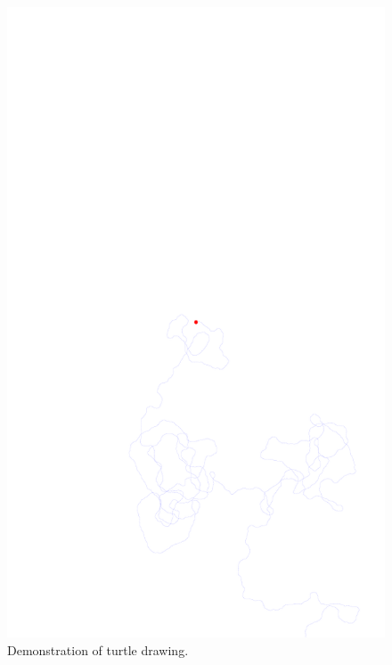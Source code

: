 \documentclass[../notebook.tex]{subfiles}
\begin{document}
\begin{figure}[ht]
  \centering
  \includegraphics{../python-notebooks/turtle.pdf}
  \caption{Demonstration of turtle drawing.}\label{fig:turtle}
\end{figure}
\end{document}
